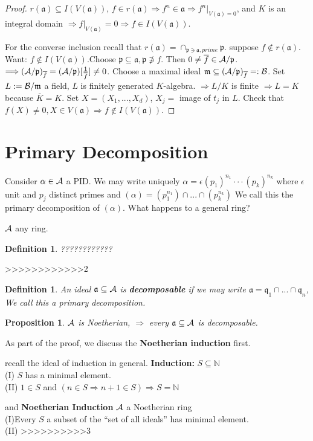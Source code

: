 \documentclass[11pt]{article}
\newtheorem{prop}[thm]{Proposition}
\newtheorem{dfn}[thm]{Definition}
\newcommand{\sca}{{\mathfrak a}}
\newcommand{\scm}{{\mathfrak m}}
\newcommand{\scp}{{\mathfrak p}}
\newcommand{\scq}{\mathfrak q}
\newcommand{\cala}{{\cal A}}
\newcommand{\calb}{{\cal B}}
\newcommand{\Lrta}{\Longrightarrow}
\begin{document}
\begin{proof}
$r(\sca)\subseteq I(V(\sca))$, $f\in r(\sca)\Lrta f^n\in \sca\Lrta f^n|_{V(\sca)=0}$, and $K$ is an integral domain $\Lrta f|_{V(\sca)}=0$$\Lrta f\in I(V(\sca))$. 

For the converse inclusion recall that $r(\sca)=\cap_{\scp\ni \sca, prime}\scp$. suppose $f\notin  r(\sca) $. Want: $f\notin I(V(\sca))$.Choose $\scp\subseteq \sca,\scp \not \ni f$. Then $0\neq \overline{f}\in \cala/\scp$. $\Lrta (\cala/\scp)_{\overline{f}}=(\cala/\scp)[\frac{1}{\overline{f}}]\neq 0$. Choose a maximal ideal $\scm\subseteq (\cala/\scp)_{\overline{f}}=:\calb$. Set $L:=\calb/\scm$ a field, $L$ is finitely generated $K$-algebra. $\Lrta L/K $ is finite $\Lrta L=K$ because $\overline{K}=K$. Set $X=(X_1,...,X_d)$, $X_j=$ image of $t_j$ in $L$. Check that $f(X)\neq 0,X\in V(\sca)\Lrta f\notin I(V(\sca))$.
\end{proof}

\section{Primary Decomposition}
Consider $\alpha\in \cala$ a PID. We may write uniquely $\alpha=\epsilon (p_1)^{n_1}\cdot \cdot\cdot (p_k)^{n_k}$ where $\epsilon$ unit and $p_j$ distinct  primes and $(\alpha)=(p_1^{n_1})\cap...\cap(p_k^{n_k})$ We call this the primary decomposition of $(\alpha)$. What happens to a general ring?

$\cala$ any ring.
\begin{dfn}
????????????
\end{dfn}
>>>>>>>>>>>>2
\begin{dfn}
An ideal $\sca\subseteq \cala$ is \textbf{decomposable} if we may write $\sca=\scq_1\cap...\cap \scq_n$, We call this a primary decomposition.
\end{dfn}
\begin{prop}
$\cala$ is Noetherian, $\Lrta$ every $\sca\subseteq \cala$ is decomposable. 
\end{prop}
As part of the proof, we discuss the \textbf{Noetherian induction} first.

recall the ideal of induction in general.
\textbf{Induction:} $S\subseteq \mathbb{N}$\\
(I) $S$ has a minimal element.\\
(II) $1\in S$ and $(n\in S\Lrta n+1\in S)\Lrta S=\mathbb{N}$

and 
\textbf{Noetherian Induction} $\cala$ a Noetherian ring\\
(I)Every $S$ a subset of the ``set of all ideals'' has minimal element.
\\
(II)
>>>>>>>>>>3 
\end{document}
